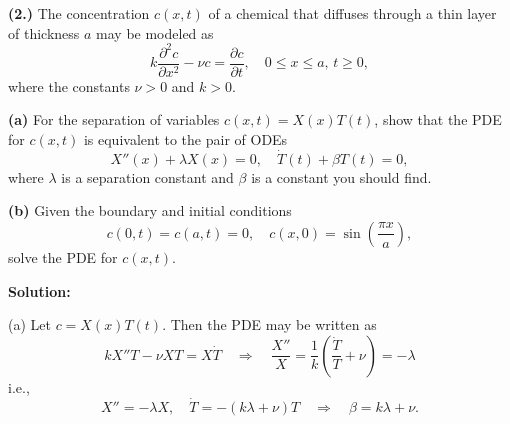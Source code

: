 \documentclass[10pt,landscape]{article}
\begin{document}
\begin{multicols}{2}
\textbf{(2.)} The concentration \( c(x, t) \) of a chemical that diffuses through a thin layer of thickness \( a \) may be modeled as\\
\[
k \frac{\partial^2 c}{\partial x^2} - \nu c = \frac{\partial c}{\partial t}, \quad 0 \le x \le a, \, t \ge 0,
\]
where the constants \( \nu > 0 \) and \( k > 0 \).

\textbf{(a)} For the separation of variables \( c(x, t) = X(x) T(t) \), show that the PDE for \( c(x, t) \) is equivalent to the pair of ODEs\\
\[
X''(x) + \lambda X(x) = 0, \quad \dot{T}(t) + \beta T(t) = 0,
\]
where \( \lambda \) is a separation constant and \( \beta \) is a constant you should find.

\textbf{(b)} Given the boundary and initial conditions\\
\[
c(0, t) = c(a, t) = 0, \quad c(x, 0) = \sin\left( \frac{\pi x}{a} \right),
\]
solve the PDE for \( c(x, t) \).

\textbf{Solution:}


(a) Let \( c = X(x) T(t) \). Then the PDE may be written as\\
\[
k X'' T - \nu X T = X \dot{T} \quad \Rightarrow \quad \frac{X''}{X} = \frac{1}{k} \left( \frac{\dot{T}}{T} + \nu \right) = -\lambda
\]
i.e., 
\[
X'' = -\lambda X, \quad \dot{T} = -(k \lambda + \nu) T \quad \Rightarrow \quad \beta = k \lambda + \nu.
\]


\end{multicols}
\end{document}
